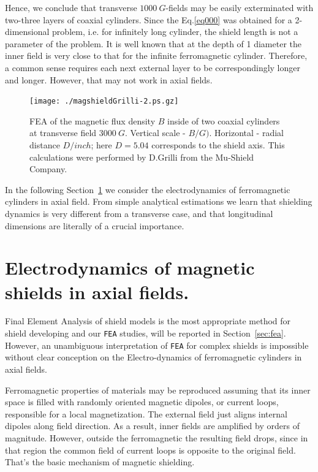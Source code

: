 \documentclass[12pt]{article}
\begin{document}
Hence, we conclude that transverse $1000~G$-fields may be easily  exterminated with two-three layers
of coaxial cylinders. Since the  Eq.\ref{eq000}  was obtained for a 2-dimensional problem, i.e. for  
infinitely long cylinder, the shield length is not a  parameter of the problem.
It is well known that at the depth  of 1 diameter the inner field is very close to that for the 
infinite ferromagnetic  cylinder. Therefore, a common sense requires each next external layer to be 
correspondingly longer and longer. However, that may not work in axial fields.

   





\begin{figure}[htbp]%
\begin{center}
\texttt{[image: ./magshieldGrilli-2.ps.gz]}
\end{center}
\caption{\small{
FEA of the magnetic flux density $B$ inside of two 
coaxial cylinders at transverse  field $3000~G$. 
Vertical scale -  $B/G)$. Horizontal 
- radial distance $D/inch$; here $D=5.04$ corresponds to the shield axis. 
This calculations were performed  by D.Grilli from the Mu-Shield Company.}
\label{shieldGrilli}}
\end{figure}

In  the following Section~\ref{sec:ednmics} we consider  the electrodynamics of  
ferromagnetic cylinders  in axial field. From simple analytical estimations  
we learn that shielding dynamics  is very  different from a transverse case,
and that longitudinal dimensions are literally of a crucial importance. 

\section{Electrodynamics of   magnetic shields in axial fields.}
\label{sec:ednmics}
Final Element Analysis   of  shield models  is the most appropriate
method for shield developing and  our {\tt FEA} studies\cite{dynshi},\cite{wieland} will be  reported  
in Section~\ref{sec:fea}.
However, an unambiguous interpretation of {\tt FEA} for complex shields is impossible
without clear  conception on  the Electro-dynamics of ferromagnetic  cylinders in axial fields.


Ferromagnetic properties of materials may be reproduced assuming that its  
inner space is filled with  randomly oriented  magnetic dipoles, or current loops, responsible for 
a local  magnetization. The external  field  just aligns internal  dipoles along 
field  direction. As a result, inner   fields  are amplified  by  
orders of magnitude. However,  outside the ferromagnetic the resulting field  
drops, since   in that region the  common  field of  current loops  
is opposite to the original  field. That's the basic mechanism of magnetic shielding.
\end{document}
